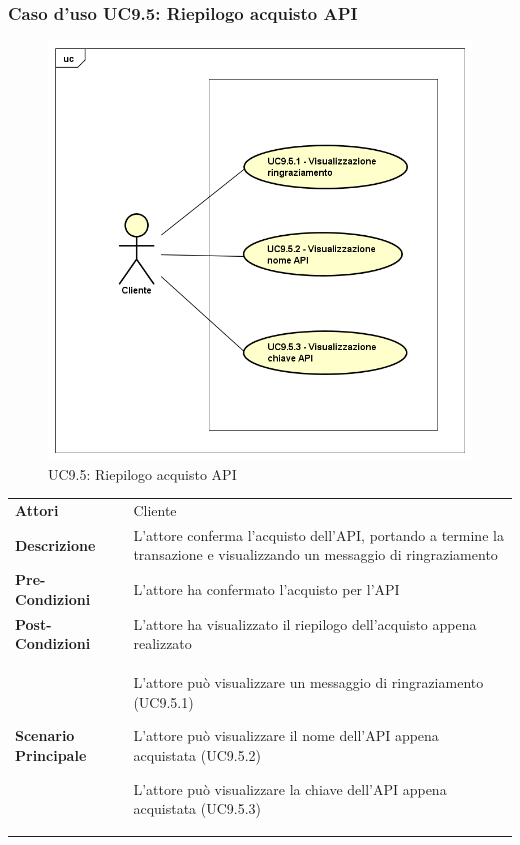 \subsubsection{Caso d'uso UC9.5: Riepilogo acquisto API}
\label{UC9_5}
\begin{figure}[ht]
	\centering
	\includegraphics[scale=0.45]{UML/UC9_5.png}
	\caption{UC9.5: Riepilogo acquisto API}
\end{figure}

\begin{minipage}{\linewidth}
	\begin{tabular}{ l | p{11cm}}
		\hline
		\rowcolor{Gray}
		\multicolumn{2}{c}{UC9.5 - Riepilogo acquisto API} \\
		\hline
		\textbf{Attori} & Cliente \\
		\textbf{Descrizione} & L'attore conferma l'acquisto dell'API, portando a termine la transazione e visualizzando un messaggio di ringraziamento \\
		\textbf{Pre-Condizioni} & L'attore ha confermato l'acquisto per l'API \\
		\textbf{Post-Condizioni} & L'attore ha visualizzato il riepilogo dell'acquisto appena realizzato \\
		\textbf{Scenario Principale} & 
		\begin{enumerate*}[label=(\arabic*.),itemjoin={\newline}]
			\item L'attore può visualizzare un messaggio di ringraziamento (UC9.5.1)
			\item L'attore può visualizzare il nome dell'API appena acquistata (UC9.5.2)
			\item L'attore può visualizzare la chiave dell'API appena acquistata (UC9.5.3)
		\end{enumerate*}\\
	\end{tabular}
\end{minipage}

